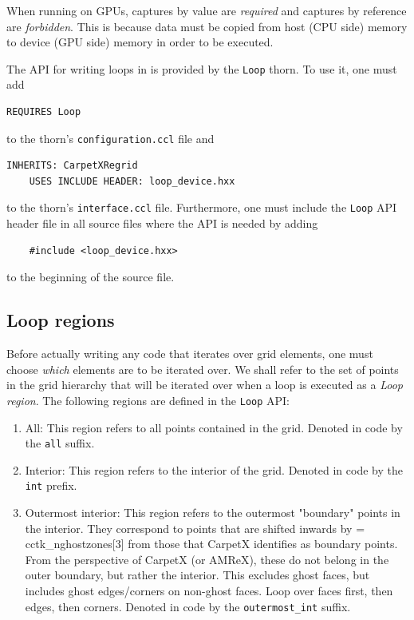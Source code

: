 When running on GPUs, captures by value are \textit{required} and captures by reference are \textit{forbidden}. This is because data must be copied from host (CPU side) memory to device (GPU side) memory in order to be executed.

The API for writing loops in \CarpetX\space is provided by the \texttt{Loop} thorn. To use it, one must add
%
\begin{lstlisting}[language=Bash]
    REQUIRES Loop
\end{lstlisting}
%
to the thorn's \texttt{configuration.ccl} file and
%
\begin{lstlisting}[language=Bash]
    INHERITS: CarpetXRegrid
    USES INCLUDE HEADER: loop_device.hxx
\end{lstlisting}
%
to the thorn's \texttt{interface.ccl} file. Furthermore, one must include the \texttt{Loop} API header file in all source files where the API is needed by adding
%
\begin{lstlisting}
    #include <loop_device.hxx>
\end{lstlisting}
%
to the beginning of the source file.

\subsection{Loop regions}
\label{sec:loop_regions}

Before actually writing any code that iterates over grid elements, one must choose \textit{which} elements are to be iterated over. We shall refer to the set of points in the grid hierarchy that will be iterated over when a loop is executed as a \textit{Loop region}. The following regions are defined in the \texttt{Loop} API:

\begin{enumerate}
    \item All: This region refers to all points contained in the grid. Denoted in code by the \texttt{all} suffix.
    
    \item Interior: This region refers to the interior of the grid. Denoted in code by the \texttt{int} prefix.
    
    \item Outermost interior: This region refers to the outermost "boundary" points in the interior. They correspond to points that are shifted inwards by = cctk\_nghostzones[3] from those that CarpetX identifies as boundary points. From the perspective of CarpetX (or AMReX), these do not belong in the outer boundary, but rather the interior. This excludes ghost faces, but includes ghost edges/corners on non-ghost faces. Loop over faces first, then edges, then corners. Denoted in code by the \texttt{outermost\_int} suffix.
\end{enumerate}

